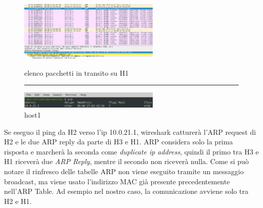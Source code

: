 \documentclass{article}
\begin{document}
\begin{figure} %
 \vspace{-10pt}
    \centering
    \includegraphics[width=0.6\textwidth]{duplicati1.png}
    \vspace{-5pt}
    \caption{elenco pacchetti in transito su H1}
   
\rule[5mm]{10cm}{0.5pt}
  \centering
  \vspace{-5pt}
  \includegraphics[width=0.6\textwidth]{host1ARP.png}
  \vspace{-4pt}
  \caption{host1}
  \vspace{-20pt}
\end{figure}

Se eseguo il ping da H2 verso l’ip 10.0.21.1, wireshark catturerà l’ARP request di H2 e le due ARP reply da parte di H3 e H1. ARP considera solo la prima risposta e marcherà la seconda come \textit{duplicate ip address}, quindi il primo tra H3 e H1 riceverà due \textit{ARP Reply}, mentre il secondo non riceverà nulla.
Come si può notare il rinfresco delle tabelle ARP non viene eseguito tramite un messaggio broadcast, ma viene usato l’indirizzo MAC già presente precedentemente nell'ARP Table. Ad esempio nel nostro caso, la comunicazione avviene solo tra H2 e H1.
\end{document}
